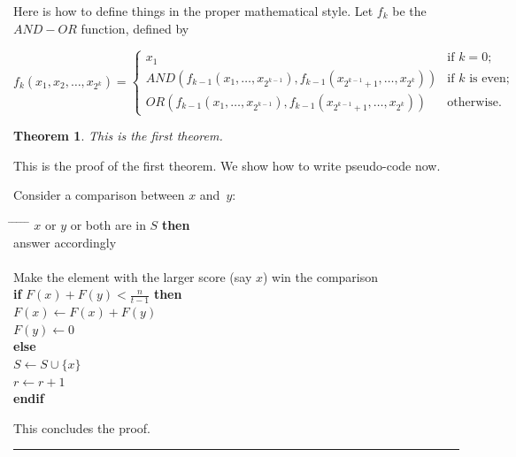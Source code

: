 \documentclass[twoside]{article}
\newcounter{lecnum}
\newtheorem{theorem}{Theorem}[lecnum]
\newenvironment{proof}{{\bf Proof:}}{\hfill\rule{2mm}{2mm}}
\begin{document}
Here is how to define things in the proper mathematical style.
Let $f_k$ be the $AND-OR$ function, defined by

\[ f_k(x_1, x_2, \ldots, x_{2^k}) = \left\{ \begin{array}{ll}

	x_1 & \mbox{if $k = 0$;} \\

	AND(f_{k-1}(x_1, \ldots, x_{2^{k-1}}),
	   f_{k-1}(x_{2^{k-1} + 1}, \ldots, x_{2^k}))
	 & \mbox{if $k$ is even;} \\

	OR(f_{k-1}(x_1, \ldots, x_{2^{k-1}}),
	   f_{k-1}(x_{2^{k-1} + 1}, \ldots, x_{2^k}))	
	& \mbox{otherwise.} 
	\end{array}
	\right. \]

\begin{theorem}
This is the first theorem.
\end{theorem}

\begin{proof}
This is the proof of the first theorem. We show how to write pseudo-code now.

Consider a comparison between $x$ and~$y$:
\begin{tabbing}
\hspace*{.25in} \= \hspace*{.25in} \= \hspace*{.25in} \= \hspace*{.25in} \= \hspace*{.25in} \=\kill
{} $x$ or $y$ or both are in $S$ {\bf then } \\
\>\> answer accordingly \\
 \\
\>\>    Make the element with the larger score (say $x$) win the comparison \\
\>\> {\bf if} $F(x) + F(y) < \frac{n}{t-1}$ {\bf then} \\%
\>\>\> $F(x) \leftarrow F(x) + F(y)$ \\
\>\>\> $F(y) \leftarrow 0$ \\
\>\> {\bf else}  \\
\>\>\> $S \leftarrow S \cup \{ x \} $ \\
\>\>\> $r \leftarrow r+1$ \\
\>\> {\bf endif} \\
\end{tabbing}

This concludes the proof.
\end{proof}
\end{document}
